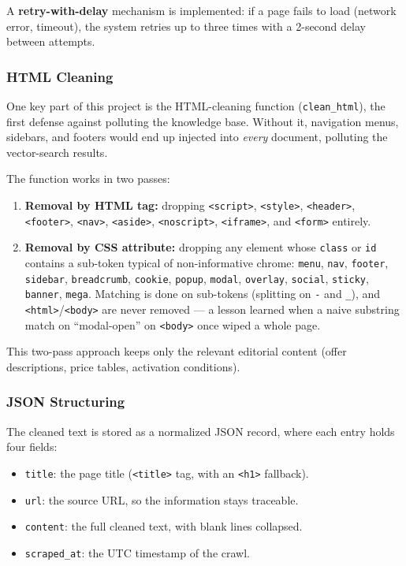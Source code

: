 \documentclass[12pt, a4paper]{report}
\newcommand{\humantext}[1]{#1}      %
\begin{document}
\humantext{A \textbf{retry-with-delay} mechanism is implemented: if a page fails to load (network error, timeout), the system retries up to three times with a 2-second delay between attempts.}

\subsubsection{HTML Cleaning}
\humantext{One key part of this project is the HTML-cleaning function (\texttt{clean\_html}), the first defense against polluting the knowledge base. Without it, navigation menus, sidebars, and footers would end up injected into \textit{every} document, polluting the vector-search results.}

\humantext{The function works in two passes:}
\begin{enumerate}[noitemsep]
    \item \humantext{\textbf{Removal by HTML tag:} dropping \texttt{<script>}, \texttt{<style>}, \texttt{<header>}, \texttt{<footer>}, \texttt{<nav>}, \texttt{<aside>}, \texttt{<noscript>}, \texttt{<iframe>}, and \texttt{<form>} entirely.}
    \item \humantext{\textbf{Removal by CSS attribute:} dropping any element whose \texttt{class} or \texttt{id} contains a sub-token typical of non-informative chrome: \texttt{menu}, \texttt{nav}, \texttt{footer}, \texttt{sidebar}, \texttt{breadcrumb}, \texttt{cookie}, \texttt{popup}, \texttt{modal}, \texttt{overlay}, \texttt{social}, \texttt{sticky}, \texttt{banner}, \texttt{mega}. Matching is done on sub-tokens (splitting on \texttt{-} and \texttt{\_}), and \texttt{<html>}/\texttt{<body>} are never removed --- a lesson learned when a naive substring match on ``modal-open'' on \texttt{<body>} once wiped a whole page.}
\end{enumerate}

\humantext{This two-pass approach keeps only the relevant editorial content (offer descriptions, price tables, activation conditions).}

\subsubsection{JSON Structuring}
\humantext{The cleaned text is stored as a normalized JSON record, where each entry holds four fields:}
\begin{itemize}[noitemsep]
    \item \humantext{\texttt{title}: the page title (\texttt{<title>} tag, with an \texttt{<h1>} fallback).}
    \item \humantext{\texttt{url}: the source URL, so the information stays traceable.}
    \item \humantext{\texttt{content}: the full cleaned text, with blank lines collapsed.}
    \item \humantext{\texttt{scraped\_at}: the UTC timestamp of the crawl.}
\end{itemize}
\end{document}
